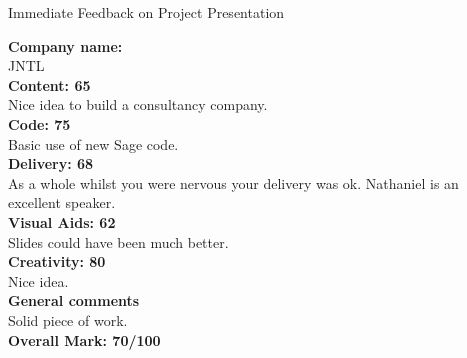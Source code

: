 \documentclass{article}
\begin{document}
\begin{center}
\Huge{Immediate Feedback on Project Presentation}\\
\end{center}


\normalsize
\textbf{Company name:}\\

JNTL \\

\textbf{Content: 65}\\

Nice idea to build a consultancy company.\\

\textbf{Code: 75}\\

Basic use of new Sage code.\\

\textbf{Delivery: 68}\\

As a whole whilst you were nervous your delivery was ok.
Nathaniel is an excellent speaker.\\

\textbf{Visual Aids: 62}\\

Slides could have been much better.\\

\textbf{Creativity: 80}\\

Nice idea.\\

\textbf{General comments}\\

Solid piece of work.\\

\textbf{Overall Mark: 70/100}
\end{document}
